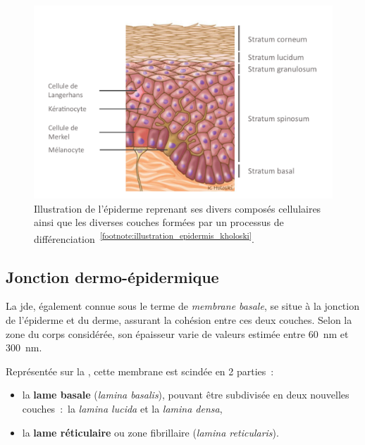  \begin{figure}[H]
    \centering
    \includegraphics[width=0.9\linewidth]{contents/chapter_1/resources/illustration_epidermis_kholoski.pdf}
    \caption{Illustration de l'épiderme reprenant ses divers composés cellulaires ainsi que les diverses couches formées par un processus de différenciation~\textsuperscript{\ref{footnote:illustration_epidermis_kholoski}}.}
    \label{fig:illustration_epidermis_kholoski}
\end{figure}\par

\addtocounter{footnote}{1}
\clearpage

\subsection{Jonction dermo-épidermique}
La \gls{jde}, également connue sous le terme de \textit{membrane basale}, se situe à la jonction de l’épiderme et du derme, assurant la cohésion entre ces deux couches. Selon la zone du corps considérée, son épaisseur varie de valeurs estimée entre \SI{60}{\nano\metre} et \SI{300}{\nano\metre}.\par

Représentée sur la , cette membrane est scindée en 2 parties~:
\begin{itemize}
    \item la \textbf{lame basale} (\textit{lamina basalis}), pouvant être subdivisée en deux nouvelles couches~:~la \textit{lamina lucida} et la \textit{lamina densa},
    \item la \textbf{lame réticulaire} ou zone fibrillaire (\textit{lamina reticularis}).
\end{itemize}\par

